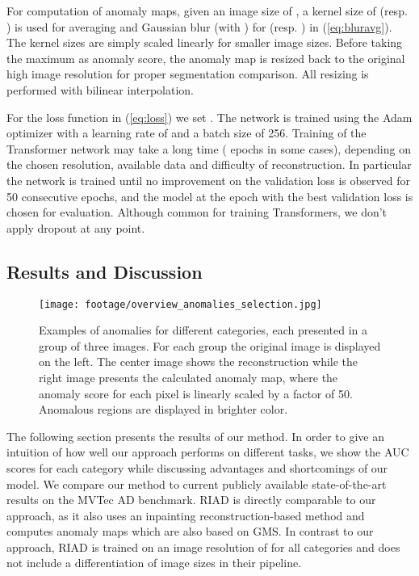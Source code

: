 \documentclass[final,5p,times,twocolumn]{elsarticle}
\begin{document}
	For computation of anomaly maps, given an image size of , a kernel size of  (resp. ) is used for averaging and Gaussian blur (with ) for  (resp. ) in (\ref{eq:bluravg}). The kernel sizes are simply scaled linearly for smaller image sizes. Before taking the maximum as anomaly score, the anomaly map is resized back to the original high image resolution for proper segmentation comparison.  
	All resizing is performed with bilinear interpolation. 
	
	For the loss function  in (\ref{eq:loss}) we set . The network is trained using the Adam optimizer with a learning rate of  and a batch size of 256. Training of the Transformer network may take a long time ( epochs in some cases), depending on the chosen resolution, available data and difficulty of reconstruction. In particular the network is trained until no improvement on the validation loss is observed for 50 consecutive epochs, and the model at the epoch with the best validation loss is chosen for evaluation.  
	Although common for training Transformers, we don't apply dropout at any point. 
	
	\subsection{Results and Discussion}
	
	\begin{figure}[t]
		\centering
		\texttt{[image: footage/overview\_anomalies\_selection.jpg]}
		\caption{Examples of anomalies for different categories, each presented in a group of three images. For each group the original image is displayed on the left. The center image shows the reconstruction while the right image presents the calculated anomaly map, where the anomaly score for each pixel is linearly scaled by a factor of 50. Anomalous regions are displayed in brighter color.}
		\label{fig:overview_anomalies_selection}
	\end{figure}
	
	
	The following section presents the results of our method. In order to give an intuition of how well our approach performs on different tasks, we show the AUC scores for each category while discussing advantages and shortcomings of our model. We compare our method to current publicly available state-of-the-art results on the MVTec AD benchmark. RIAD \cite{ZAVRTANIK2021107706} is directly comparable to our approach, as it also uses an inpainting reconstruction-based method and computes anomaly maps which are also based on GMS. In contrast to our approach, RIAD is trained on an image resolution of  for all categories and does not include a differentiation of image sizes in their pipeline.
	
\end{document}
